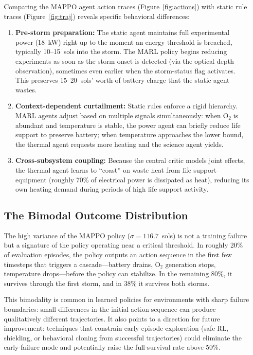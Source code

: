 \documentclass[11pt,a4paper]{article}
\begin{document}
Comparing the MAPPO agent action traces (Figure~\ref{fig:actions}) with static rule traces (Figure~\ref{fig:traj}) reveals specific behavioral differences:

\begin{enumerate}[label=(\arabic*)]
  \item \textbf{Pre-storm preparation:} The static agent maintains full experimental power (18~kW) right up to the moment an energy threshold is breached, typically 10--15~sols into the storm. The MARL policy begins reducing experiments as soon as the storm onset is detected (via the optical depth observation), sometimes even earlier when the storm-status flag activates. This preserves 15--20~sols' worth of battery charge that the static agent wastes.

  \item \textbf{Context-dependent curtailment:} Static rules enforce a rigid hierarchy. MARL agents adjust based on multiple signals simultaneously: when O$_2$ is abundant and temperature is stable, the power agent can briefly reduce life support to preserve battery; when temperature approaches the lower bound, the thermal agent requests more heating and the science agent yields.

  \item \textbf{Cross-subsystem coupling:} Because the central critic models joint effects, the thermal agent learns to ``coast'' on waste heat from life support equipment (roughly 70\% of electrical power is dissipated as heat), reducing its own heating demand during periods of high life support activity.
\end{enumerate}

\subsection{The Bimodal Outcome Distribution}

The high variance of the MAPPO policy ($\sigma = 116.7$~sols) is not a training failure but a signature of the policy operating near a critical threshold. In roughly 20\% of evaluation episodes, the policy outputs an action sequence in the first few timesteps that triggers a cascade---battery drains, O$_2$ generation stops, temperature drops---before the policy can stabilize. In the remaining 80\%, it survives through the first storm, and in 38\% it survives both storms.

This bimodality is common in learned policies for environments with sharp failure boundaries: small differences in the initial action sequence can produce qualitatively different trajectories. It also points to a direction for future improvement: techniques that constrain early-episode exploration (safe RL, shielding, or behavioral cloning from successful trajectories) could eliminate the early-failure mode and potentially raise the full-survival rate above 50\%.
\end{document}
